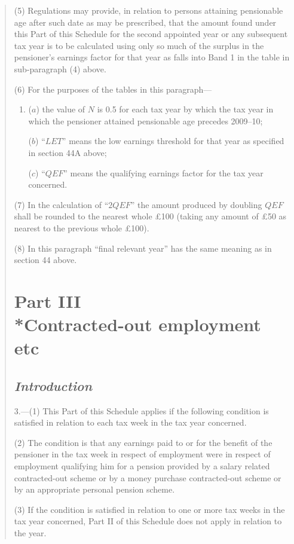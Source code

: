 \documentclass[12pt,a4paper]{article}
\begin{document}
\begin{quotation}
{}

(5) Regulations may provide, in relation to persons attaining pensionable age after such date as may be prescribed, that the amount found under this Part of this Schedule for the second appointed year or any subsequent tax year is to be calculated using only so much of the surplus in the pensioner’s earnings factor for that year as falls into Band 1 in the table in sub-paragraph (4)  above.

(6) For the purposes of the tables in this paragraph—
\begin{enumerate}\item[]
($a$) the value of $N$ is 0.5 for each tax year by which the tax year in which the pensioner attained pensionable age precedes 2009--10;

($b$) “$LET$” means the low earnings threshold for that year as specified in section 44A above;

($c$) “$QEF$” means the qualifying earnings factor for the tax year concerned.
\end{enumerate}

(7) In the calculation of “$2QEF$” the amount produced by doubling $QEF$ shall be rounded to the nearest whole £100 (taking any amount of £50 as nearest to the previous whole £100).

(8) In this paragraph “final relevant year” has the same meaning as in section 44 above.

\section*{Part III\\*Contracted-out employment etc}
\subsection*{\itshape Introduction}

3.---(1) This Part of this Schedule applies if the following condition is satisfied in relation to each tax week in the tax year concerned.

(2) The condition is that any earnings paid to or for the benefit of the pensioner in the tax week in respect of employment were in respect of employment qualifying him for a pension provided by a salary related contracted-out scheme or by a money purchase contracted-out scheme or by an appropriate personal pension scheme.

(3) If the condition is satisfied in relation to one or more tax weeks in the tax year 
concerned, Part II of this Schedule does not apply in relation to the year.


\end{quotation}
\end{document}
